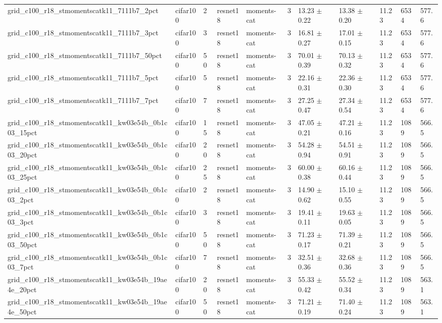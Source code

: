 \begin{tabular}{lllllllllll}
grid_c100_r18_stmomentscatk11_7111b7_2pct & cifar100 & 2 & resnet18 & moments-cat & 3 & 13.23 $\pm$ 0.22 & 13.38 $\pm$ 0.20 & 11.23 & 6534 & 577.6 \\
grid_c100_r18_stmomentscatk11_7111b7_3pct & cifar100 & 3 & resnet18 & moments-cat & 3 & 16.81 $\pm$ 0.27 & 17.01 $\pm$ 0.15 & 11.23 & 6534 & 577.6 \\
grid_c100_r18_stmomentscatk11_7111b7_50pct & cifar100 & 50 & resnet18 & moments-cat & 3 & 70.01 $\pm$ 0.39 & 70.13 $\pm$ 0.32 & 11.23 & 6534 & 577.6 \\
grid_c100_r18_stmomentscatk11_7111b7_5pct & cifar100 & 5 & resnet18 & moments-cat & 3 & 22.16 $\pm$ 0.31 & 22.36 $\pm$ 0.30 & 11.23 & 6534 & 577.6 \\
grid_c100_r18_stmomentscatk11_7111b7_7pct & cifar100 & 7 & resnet18 & moments-cat & 3 & 27.25 $\pm$ 0.47 & 27.34 $\pm$ 0.54 & 11.23 & 6534 & 577.6 \\
grid_c100_r18_stmomentscatk11_kw03e54b_0b1c03_15pct & cifar100 & 15 & resnet18 & moments-cat & 3 & 47.05 $\pm$ 0.21 & 47.21 $\pm$ 0.16 & 11.23 & 1089 & 566.5 \\
grid_c100_r18_stmomentscatk11_kw03e54b_0b1c03_20pct & cifar100 & 20 & resnet18 & moments-cat & 3 & 54.28 $\pm$ 0.94 & 54.51 $\pm$ 0.91 & 11.23 & 1089 & 566.5 \\
grid_c100_r18_stmomentscatk11_kw03e54b_0b1c03_25pct & cifar100 & 25 & resnet18 & moments-cat & 3 & 60.00 $\pm$ 0.38 & 60.16 $\pm$ 0.44 & 11.23 & 1089 & 566.5 \\
grid_c100_r18_stmomentscatk11_kw03e54b_0b1c03_2pct & cifar100 & 2 & resnet18 & moments-cat & 3 & 14.90 $\pm$ 0.62 & 15.10 $\pm$ 0.55 & 11.23 & 1089 & 566.5 \\
grid_c100_r18_stmomentscatk11_kw03e54b_0b1c03_3pct & cifar100 & 3 & resnet18 & moments-cat & 3 & 19.41 $\pm$ 0.11 & 19.63 $\pm$ 0.05 & 11.23 & 1089 & 566.5 \\
grid_c100_r18_stmomentscatk11_kw03e54b_0b1c03_50pct & cifar100 & 50 & resnet18 & moments-cat & 3 & 71.23 $\pm$ 0.17 & 71.39 $\pm$ 0.21 & 11.23 & 1089 & 566.5 \\
grid_c100_r18_stmomentscatk11_kw03e54b_0b1c03_7pct & cifar100 & 7 & resnet18 & moments-cat & 3 & 32.51 $\pm$ 0.36 & 32.68 $\pm$ 0.36 & 11.23 & 1089 & 566.5 \\
grid_c100_r18_stmomentscatk11_kw03e54b_19ae4e_20pct & cifar100 & 20 & resnet18 & moments-cat & 3 & 55.33 $\pm$ 0.42 & 55.52 $\pm$ 0.34 & 11.23 & 1089 & 563.1 \\
grid_c100_r18_stmomentscatk11_kw03e54b_19ae4e_50pct & cifar100 & 50 & resnet18 & moments-cat & 3 & 71.21 $\pm$ 0.19 & 71.40 $\pm$ 0.24 & 11.23 & 1089 & 563.1 \\

\end{tabular}
